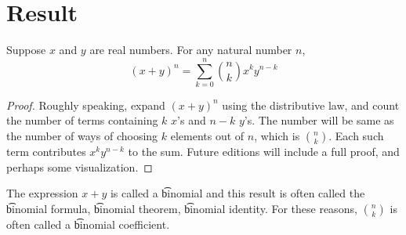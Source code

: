
\section*{Result}

\begin{proposition}
Suppose $x$ and $y$ are real numbers.
For any natural number $n$,
\[
(x+y)^n = \sum_{k = 0}^{n} {n \choose k} x^{k}y^{n-k}
\]
\begin{proof}Roughly speaking, expand $(x+y)^n$ using the distributive law, and count the number of terms containing $k$ $x$'s and $n-k$ $y$'s.
The number will be same as the number of ways of choosing $k$ elements out of $n$, which is ${n \choose k}$.
Each such term contributes $x^ky^{n-k}$ to the sum.
Future editions will include a full proof, and perhaps some visualization.\end{proof}
\end{proposition}

The expression $x+y$ is called a \t{binomial} and this result is often called the \t{binomial formula}, \t{binomial theorem}, \t{binomial identity}.
For these reasons, ${n \choose k}$ is often called a \t{binomial coefficient}.

\blankpage